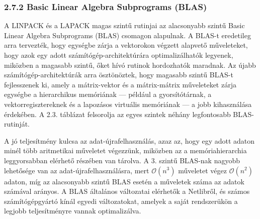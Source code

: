 \documentclass[
  magyar,
  11pt]{article}
\begin{document}
\subsubsection{2.7.2 Basic Linear Algebra Subprograms
(BLAS)}\label{basic-linear-algebra-subprograms-blas}

A LINPACK és a LAPACK magas szintű rutinjai az alacsonyabb szintű Basic
Linear Algebra Subprograms (BLAS) csomagon alapulnak. A BLAS-t
eredetileg arra tervezték, hogy egységbe zárja a vektorokon végzett
alapvető műveleteket, hogy azok egy adott számítógép-architektúrára
optimalizálhatók legyenek, miközben a magasabb szintű, őket hívó rutinok
hordozhatók maradnak. Az újabb számítógép-architektúrák arra
ösztönöztek, hogy magasabb szintű BLAS-t fejlesszenek ki, amely a
mátrix-vektor és a mátrix-mátrix műveleteket zárja egységbe a
hierarchikus memóriának --- például a gyorsítótárnak, a
vektorregisztereknek és a lapozásos virtuális memóriának --- a jobb
kihasználása érdekében. A 2.3. táblázat felsorolja az egyes szintek
néhány legfontosabb BLAS-rutinját.

A jó teljesítmény kulcsa az adat-újrafelhasználás, azaz az, hogy egy
adott adaton minél több aritmetikai műveletet végezzünk, miközben az a
memóriahierarchia leggyorsabban elérhető részében van tárolva. A 3.
szintű BLAS-nak nagyobb lehetősége van az adat-újrafelhasználásra, mert
\(\mathcal{O}(n^3)\) műveletet végez \(\mathcal{O}(n^2)\) adaton, míg az
alacsonyabb szintű BLAS esetén a műveletek száma az adatok számával
arányos. A BLAS általános változatai elérhetők a Netlibről, és számos
számítógépgyártó kínál egyedi változatokat, amelyek a saját rendszerükön
a legjobb teljesítményre vannak optimalizálva.
\end{document}

